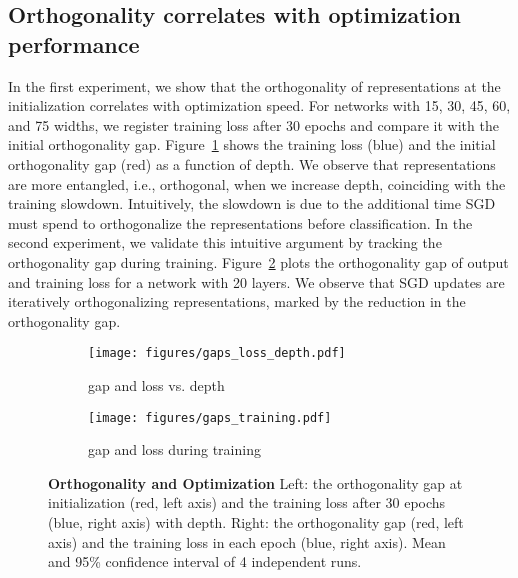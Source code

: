 \subsection{Orthogonality correlates with optimization performance}
In the first experiment, we show that the orthogonality of representations at the initialization correlates with optimization speed. For networks with 15, 30, 45, 60, and 75 widths, we register training loss after 30 epochs and compare it with the initial orthogonality gap. Figure~\ref{ortho:fig:slowdown_depth} shows the training loss (blue) and the initial orthogonality gap (red) as a function of depth. We observe that representations are more entangled, i.e., orthogonal, when we increase depth, coinciding with the training slowdown.  Intuitively, the slowdown is due to the additional time SGD must spend to orthogonalize the representations before classification. In the second experiment, we validate this intuitive argument by tracking the orthogonality gap during training. Figure~\ref{ortho:fig:slowdown_training} plots the orthogonality gap of output and training loss for a network with 20 layers. We observe that SGD updates are iteratively orthogonalizing representations, marked by the reduction in the orthogonality gap.

 \begin{figure}[!ht]
     \centering
     \begin{subfigure}[b]{0.4\textwidth}
         \centering
         \texttt{[image: figures/gaps\_loss\_depth.pdf]}
         \caption{gap and loss vs. depth}
         \label{ortho:fig:slowdown_depth}
     \end{subfigure}
     \begin{subfigure}[b]{0.4\textwidth}
         \centering
         \texttt{[image: figures/gaps\_training.pdf]}
         \caption{gap and loss during training}
         \label{ortho:fig:slowdown_training}
     \end{subfigure}
    \caption{\footnotesize{\textbf{Orthogonality and Optimization} Left: the orthogonality gap at initialization (red, left axis) and the training loss after 30 epochs (blue, right axis) with depth. Right: the orthogonality gap (red, left axis) and  the training loss in each epoch (blue, right axis). Mean and 95\% confidence interval of 4 independent runs. }}
        \label{ortho:fig:slowdown_orthogonality}
\end{figure}


